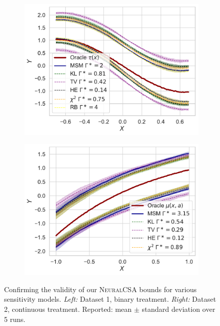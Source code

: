 \documentclass{article} %
\newcommand{\frameworkname}{\textsc{NeuralCSA}\xspace}
\theoremstyle{definition}
\theoremstyle{plain}
\begin{document}
\begin{figure}
\vspace{-0.5cm}
 \centering
\begin{subfigure}{0.30\textwidth}
  \centering
  \includegraphics[width=1\linewidth]{figures/plot_binary_1D_f.pdf}
\end{subfigure}%
\begin{subfigure}{0.30\textwidth}
  \centering
  \includegraphics[width=1\linewidth]{figures/plot_continuous_1D_f_a05.pdf}
\end{subfigure}
\vspace{-0.7cm}
\caption{Confirming the validity of our \frameworkname bounds for various sensitivity models. \emph{Left:} Dataset 1, binary treatment. \emph{Right:} Dataset 2, continuous treatment. Reported: mean $\pm$ standard deviation over 5 runs.}
\label{fig:simulation_f}
\vspace{-0.3cm}
\end{figure}
\end{document}

